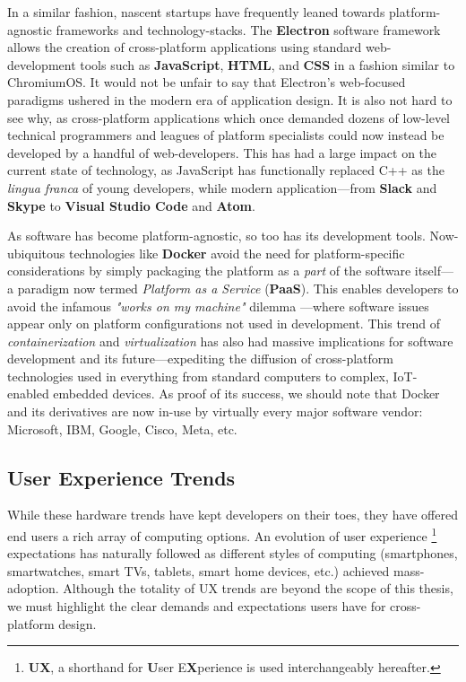 \documentclass{report}
\newcommand{\tech}[1]{\textbf{#1}}
\begin{document}
In a similar fashion, nascent startups have frequently leaned towards platform-agnostic frameworks and technology-stacks. The \tech{Electron} software framework allows the creation of cross-platform applications using standard web-development tools such as \tech{JavaScript}, \tech{HTML}, and \tech{CSS} in a fashion similar to ChromiumOS. It would not be unfair to say that Electron's web-focused paradigms ushered in the modern era of application design\cite{Alexander_2024}. It is also not hard to see why, as cross-platform applications which once demanded dozens of low-level technical programmers and leagues of platform specialists could now instead be developed by a handful of web-developers. This has had a large impact on the current state of technology, as JavaScript has functionally replaced C++ as the \emph{lingua franca} of young developers, while modern application---from \tech{Slack} and \tech{Skype} to \tech{Visual Studio Code} and \tech{Atom}.  

As software has become platform-agnostic, so too has its development tools. Now-ubiquitous technologies like \tech{Docker} avoid the need for platform-specific considerations by simply packaging the platform as a \emph{ part} of the software itself---a paradigm now termed \emph{Platform as a Service} (\tech{PaaS})\cite{kolb2019portability}. This enables developers to avoid the infamous \emph{"works on my machine"} dilemma \cite{Yadav_2021}---where software issues appear only on platform configurations not used in development. This trend of \emph{containerization} and \emph{virtualization} has also had massive implications for software development and its future---expediting the diffusion of cross-platform technologies used in everything from standard computers to complex, IoT-enabled embedded devices. As proof of its success, we should note that Docker and its derivatives are now in-use by virtually every major software vendor: Microsoft, IBM, Google, Cisco, Meta, etc.

\subsection{User Experience Trends}
While these hardware trends have kept developers on their toes, they have offered end users a rich array of computing options. An evolution of user experience \footnote{\textbf{UX}, a shorthand for \textbf{U}ser E\textbf{X}perience is used interchangeably hereafter.} expectations has naturally followed as different styles of computing (smartphones, smartwatches, smart TVs, tablets, smart home devices, etc.) achieved mass-adoption. Although the totality of UX trends are beyond the scope of this thesis, we must highlight the clear demands and expectations users have for cross-platform design. 
\end{document}
